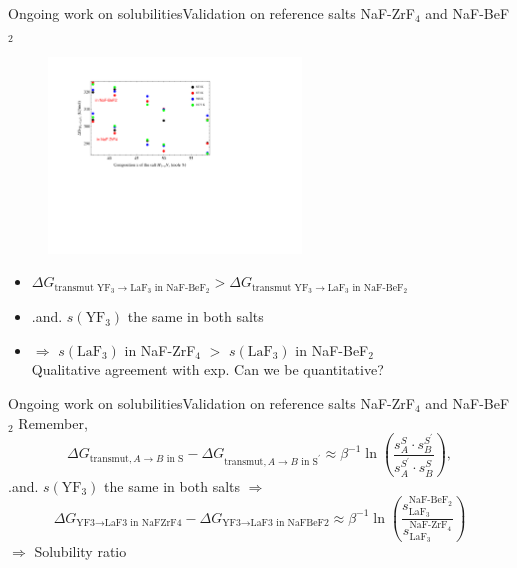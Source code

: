 \documentclass{beamer}
\begin{document}
\begin{frame}{Ongoing work on solubilities}{Validation on reference salts NaF-ZrF$_4$ and NaF-BeF$_2$}
    \begin{figure}
        \includegraphics[width=0.6\textwidth]{dGtransZrBe}
    \end{figure}
    \begin{itemize}
        \item $\Delta G_{\text{transmut YF}_3 \rightarrow \text{LaF}_3\text{ in NaF-BeF}_2} > \Delta G_{\text{transmut YF}_3 \rightarrow \text{LaF}_3\text{ in NaF-BeF}_2}$
        \item .and. $s(\text{YF}_3)$ the same in both salts
        \item $\Rightarrow$ $s(\text{LaF}_3)$ in NaF-ZrF$_4$ $>$ $s(\text{LaF}_3)$ in NaF-BeF$_2$ \\ Qualitative agreement with exp. Can we be quantitative?
    \end{itemize}
\end{frame}
\begin{frame}{Ongoing work on solubilities}{Validation on reference salts NaF-ZrF$_4$ and NaF-BeF$_2$}
    Remember,
    \begin{equation}
        \Delta G_{\text{transmut},A\rightarrow B\text{ in S}} - \Delta G_{\text{transmut},A\rightarrow B\text{ in S}^{\prime}} \approx \beta^{-1}\ln\left(\frac{s_A^S\cdot s_B^{S^\prime}}{s_A^{S^{\prime}}\cdot s_B^S}\right),   \nonumber
    \end{equation}
    .and. $s(\text{YF}_3)$ the same in both salts $\Rightarrow $
    \begin{equation}
        \Delta G_{\text{YF3}\rightarrow\text{LaF3 in NaFZrF4}} - \Delta G_{\text{YF3}\rightarrow\text{LaF3 in NaFBeF2}} \approx \beta^{-1}\ln\left(\frac{s_{\text{LaF}_3}^{\text{NaF-BeF}_2}}{s_{\text{LaF}_3}^{\text{NaF-ZrF}_4}}\right) \nonumber
    \end{equation}
    $\Rightarrow$ Solubility ratio
\end{frame}
\end{document}
